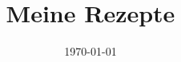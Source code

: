 \documentclass[11pt,a4paper,oneside]{scrartcl}
\begin{document}
\title{Meine Rezepte}
\author{}
\date{\today}
\maketitle

\tableofcontents
\clearpage


\printbibliography
\end{document}
